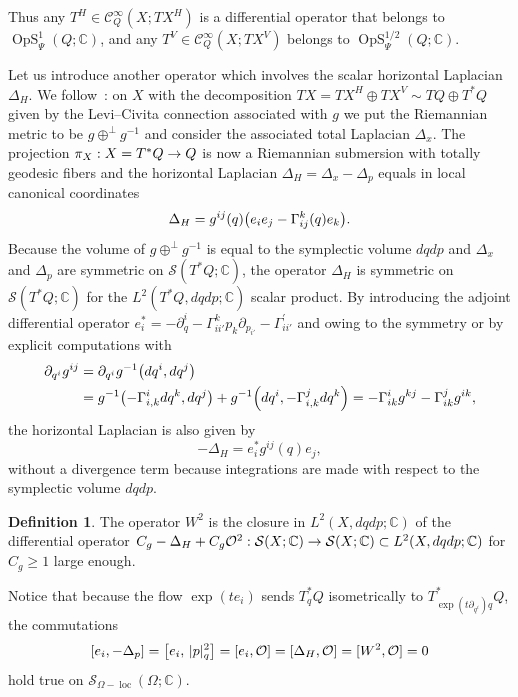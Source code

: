 \documentclass[10pt]{amsart}
\theoremstyle{definition}\newtheorem{defi}[theo]{Definition}\newtheorem{rema}[theo]{Remark}\newtheorem{exam}[theo]{Example}\newtheorem{exem}[theo]{Example}\newtheorem{nota}[theo]{Notation}
\newcommand{\C}{\mathbb{C}}
\newcommand{\clC}{\mathcal{C}}
\newcommand{\clO}{\mathcal{O}}
\newcommand{\clS}{\mathcal{S}}
\DeclareMathOperator{\OpS}{OpS}
\DeclareMathOperator{\locc}{loc}
\let\originalleft\left
\let\originalright\right
\renewcommand{\left}{\mathopen{}\mathclose\bgroup\originalleft}
\renewcommand{\right}{\aftergroup\egroup\originalright}
\renewcommand*{\to}{\mathchoice{\longrightarrow}{\rightarrow}{\rightarrow}{\rightarrow}}
\begin{document}
Thus any $T^{H}\in \clC^{\infty}_{Q}(X;TX^{H})$ is a differential operator that belongs to $\OpS_{\Psi}^{1}(Q;\C)$, and any $T^{V}\in \clC^{\infty}_{Q}(X;TX^{V})$ belongs to $\OpS^{1/2}_{\Psi}(Q;\C)$.

Let us introduce another operator which involves the scalar horizontal Lapla\-cian~$\Delta_{H}$. We follow~\cite{BeBo}: on $X$ with the decomposition $TX=TX^{H}\oplus TX^{V}\sim TQ\oplus T^{*}Q$ given by the Levi--Civita connection associated with $g$ we put the Riemannian metric to be $g\oplus^{\perp}g^{-1}$ and consider the associated total Lapla\-cian $\Delta_{x}$. The projection $\pi_{X}:X=T^{*}Q\to Q$ is now a Riemannian submersion with totally geodesic fibers and the horizontal Laplacian $\Delta_{H}=\Delta_{x}-\Delta_{p}$ equals in local canonical coordinates
\[
\Delta_{H}=g^{ij}(q)\left(e_{i}e_{j}-\Gamma_{ij}^{k}(q)e_{k}\right).
\]
Because the volume of $g\oplus^{\perp} g^{-1}$ is equal to the symplectic volume $dqdp$ and $\Delta_{x}$ and $\Delta_{p}$ are symmetric on $\clS(T^{*}Q;\C)$, the operator $\Delta_{H}$ is symmetric on $\clS(T^{*}Q;\C)$ for the $L^{2}(T^{*}Q,dqdp;\C)$ scalar product. By introducing the adjoint differential operator $e_{i}^{*}=-\partial_{q}^{i}-\Gamma_{ii'}^{k}p_{k}\partial_{p_{i'}}-\Gamma_{ii'}^{'}$ and owing to the symmetry or by explicit computations with
\begin{align*}
\partial_{q^{i}}g^{ij}&=\partial_{q^{i}}g^{-1}\left(dq^{i},dq^{j}\right)\\ &=g^{-1}\left(-\Gamma_{i,k}^{i}dq^{k},dq^{j}\right)+g^{-1}\left(dq^{i}, -\Gamma_{i,k}^{j}dq^{k}\right) =-\Gamma_{ik}^{i}g^{kj}-\Gamma_{ik}^{j}g^{ik},
\end{align*}
the horizontal Laplacian is also given by
\[
-\Delta_{H}=e_{i}^{*}g^{ij}(q)e_{j},
\]
without a divergence term because integrations are made with respect to the symplectic volume $dqdp$.
\begin{defi}\label{de:W2}
The operator $W^{2}$ is the closure in $L^{2}(X,dqdp;\C)$ of the differential operator $C_{g}-\Delta_{H}+C_{g}\clO^{2}:\clS(X;\C)\to \clS(X;\C)\subset L^{2}(X,dqdp;\C)$ for $C_{g}\geq 1$ large enough.
\end{defi}

Notice that because the flow $\exp(te_{i})$ sends $T^{*}_{q}Q$ isometrically to $T^{*}_{\exp(t\partial_{q^{i}})q}Q$, the commutations
\[
[e_{i},-\Delta_{p}]=\left[e_{i},\,|p|_{q}^{2}\right]=[e_{i},\clO]=[\Delta_{H},\clO]=[W^{2},\clO]=0
\]
hold true on $\clS_{\Omega-\locc}(\Omega;\C)$.
\end{document}
